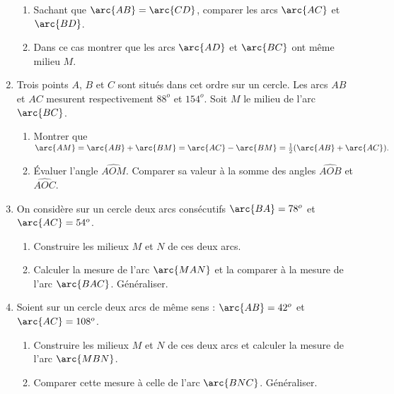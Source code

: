 \begin{enumerate}
\begin{enumerate}
\item Sachant que $\arc{AB}= \arc{CD}$, comparer les arcs $\arc{AC}$ et $\arc{BD}$. 
\item Dans ce cas montrer que les arcs $\arc{AD}$ et $\arc{BC}$ ont même milieu $M$. 
\end{enumerate}
\item Trois points $A$, $B$ et $C$ sont situés dans cet ordre sur un cercle. Les arcs $AB$ et $AC$ mesurent respectivement $88^o$ et $154^o$. Soit $M$ le milieu de l'arc $\arc{BC}$.\begin{enumerate}
\item Montrer que $\arc{AM}=\arc{AB}+\arc{BM}=\arc{AC}-\arc{BM} = \frac12(\arc{AB}+\arc{AC}).$
\item Évaluer l'angle $\widehat{AOM}$. Comparer sa valeur à la somme des angles 
$\widehat{AOB}$ et $\widehat{AOC}$. 
\end{enumerate}
\item On considère sur un cercle deux arcs consécutifs $\arc{BA}=78^o$ et $\arc{AC}=54^o$. 
\begin{enumerate}
\item Construire les milieux $M$ et $N$ de ces deux arcs. 
\item Calculer la mesure de l'arc $\arc{MAN}$ et la comparer à la mesure de l'arc $\arc{BAC}$. Généraliser. 
\end{enumerate}
\item Soient sur un cercle deux arcs de même sens : $\arc{AB}=42^o$ et $\arc{AC}= 108^o$. \begin{enumerate}
\item Construire les milieux $M$ et $N$ de ces deux arcs et calculer la mesure de 
l'arc $\arc{MBN}$. 
\item Comparer cette mesure à celle de l'arc $\arc{BNC}$. Généraliser. 
\end{enumerate}
\end{enumerate}